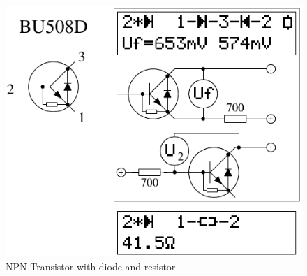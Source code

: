 \begin{figure}[H]
\centering
\includegraphics[]{../FIG/BJT_BU508D.pdf}
\caption{NPN-Transistor with diode and resistor}
\label{fig:BJT-NPN-Di-R}
\end{figure}

